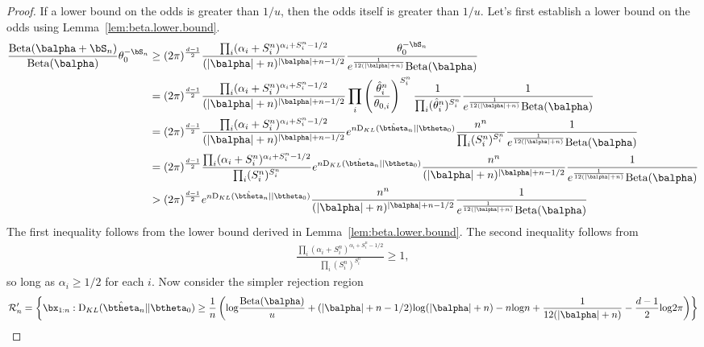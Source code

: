 \documentclass[11pt]{article}
\def\log{{\rm log}}
\newcommand{\Beta}{\mathrm{Beta}}
\newcommand{\KL}{\mathrm{D}_{KL}}
\begin{document}
\begin{proof}
If a lower bound on the odds is greater than $1/u$, then the odds itself is greater than $1/u$. Let's first
establish a lower bound on the odds using Lemma~\ref{lem:beta.lower.bound}.
\begin{align*}
    \frac{\Beta(\balpha + \bS_n)}
  {\Beta(\balpha)} \theta_0^{-\bS_n}
  &\geq
  (2\pi)^{\frac{d-1}{2}}
    \frac{ \prod_i (\alpha_i+S_i^n)^{\alpha_i + S_i^n-1/2}}
    {(|\balpha|+n)^{|\balpha| + n - 1/2}}
    \frac{ \theta_0^{-\bS_n}}{e^{\frac{1}{12(|\balpha|+n)}}\Beta(\balpha)}\\
  &=
  (2\pi)^{\frac{d-1}{2}}
    \frac{ \prod_i (\alpha_i+S_i^n)^{\alpha_i + S_i^n-1/2}}
    {(|\balpha|+n)^{|\balpha| + n - 1/2}}
    \prod_i \left( \frac{\hat{\theta}^n_i}{\theta_{0,i}} \right)^{S^n_i}
    \frac{1}{\prod_i (\hat{\theta}^n_i)^{S^{n}_{i}}}
    \frac{ 1}{e^{\frac{1}{12(|\balpha|+n)}}\Beta(\balpha)}\\
  &=
  (2\pi)^{\frac{d-1}{2}}
    \frac{ \prod_i (\alpha_i+S_i^n)^{\alpha_i + S_i^n-1/2}}
    {(|\balpha|+n)^{|\balpha| + n - 1/2}}
    e^{n \KL(\hat\btheta_n|| \btheta_0)}
    \frac{n^{n}}{\prod_i (S^n_i)^{S^{n}_{i}}}
    \frac{ 1}{e^{\frac{1}{12(|\balpha|+n)}}\Beta(\balpha)}\\
  &=
  (2\pi)^{\frac{d-1}{2}}
    \frac{ \prod_i (\alpha_i+S_i^n)^{\alpha_i + S_i^n-1/2}}
    {\prod_i (S^n_i)^{S^{n}_{i}}}
    e^{n \KL(\hat\btheta_n|| \btheta_0)}
    \frac{n^{n}}{(|\balpha|+n)^{|\balpha| + n - 1/2}}
    \frac{ 1}{e^{\frac{1}{12(|\balpha|+n)}}\Beta(\balpha)}\\
  &>
  (2\pi)^{\frac{d-1}{2}}
    e^{n \KL(\hat\btheta_n|| \btheta_0)}
    \frac{n^{n}}{(|\balpha|+n)^{|\balpha| + n - 1/2}}
    \frac{ 1}{e^{\frac{1}{12(|\balpha|+n)}}\Beta(\balpha)}\\
\end{align*}
The first inequality follows from the lower bound derived in Lemma~\ref{lem:beta.lower.bound}.
The second inequality follows from
\begin{align*}
  \frac{ \prod_i (\alpha_i+S_i^n)^{\alpha_i + S_i^n-1/2}}
  {\prod_i (S^n_i)^{S^{n}_{i}}} \geq 1,
\end{align*}
so long as $\alpha_i \geq 1/2$ for each $i$.
Now consider the simpler rejection region
\begin{align*}
  \mathcal{R}_n' &= \left\{ \bx_{1:n} : 
  \KL(\hat\btheta_n|| \btheta_0) \geq \frac{1}{n}\left( \log \frac{\Beta(\balpha)}{u} +(|\balpha|+n-1/2)\log(|\balpha|+n)-n\log n + \frac{1}{12(|\balpha|+n)} - \frac{d-1}{2}\log 2\pi\right)\right\}\\

\end{align*}
\end{proof}
\end{document}
